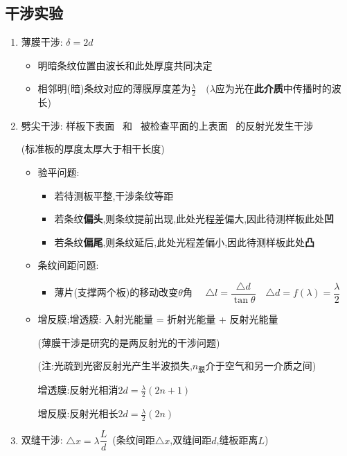 \documentclass{article}
\begin{document}
\subsection{干涉实验}
\begin{enumerate}[label = (\arabic*{})]
    \item 薄膜干涉: $\delta = 2d$
          \begin{itemize}
              \item 明暗条纹位置由波长和此处厚度共同决定
              \item 相邻明(暗)条纹对应的薄膜厚度差为$\frac{\lambda}{2} \quad (\lambda$应为光在\textbf{此介质}中传播时的波长)
          \end{itemize}
    \item 劈尖干涉: 样板下表面 \, 和 \, 被检查平面的上表面 \, 的反射光发生干涉

          \hspace{5em}(标准板的厚度太厚大于相干长度)

          \begin{itemize}
              \item[I] 验平问题:
                    \begin{itemize}
                        \item[] 若待测板平整,干涉条纹等距
                        \item[] 若条纹\textbf{偏头},则条纹提前出现,此处光程差偏大,因此待测样板此处\textbf{凹}
                        \item[] 若条纹\textbf{偏尾},则条纹延后,此处光程差偏小,因此待测样板此处\textbf{凸}
                    \end{itemize}
              \item[II] 条纹间距问题:
                    \begin{itemize}
                        \item[] 薄片(支撑两个板)的移动改变$\theta$角 $\quad \triangle l = \dfrac{\triangle d}{\tan{\theta}} \quad
                                  \triangle d = f(\lambda) = \dfrac{\lambda}{2}$
                    \end{itemize}
              \item[III] 增反膜;增透膜: 入射光能量 = 折射光能量 + 反射光能量

                    \hspace{4em}(薄膜干涉是研究的是两反射光的干涉问题)

                    \hspace{4em}(注:光疏到光密反射光产生半波损失,$n_{\text{膜}}$介于空气和另一介质之间)

                    \hspace{4em}增透膜:反射光相消$2d = \frac{\lambda}{2} (2n+1)$

                    \hspace{4em}增反膜:反射光相长$2d = \frac{\lambda}{2} (2n) $
          \end{itemize}

    \item 双缝干涉: $\triangle x = \lambda \dfrac{L}{d} \,$ (条纹间距$\triangle x $,双缝间距$d$,缝板距离$L$)
\end{enumerate}
\end{document}
